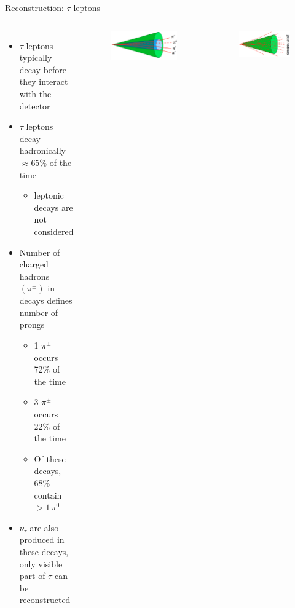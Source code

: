 \documentclass[aspectratio=169,xcolor=table]{beamer}
\begin{document}
    \begin{frame}[t]{Reconstruction: $\tau$ leptons}
      \begin{columns}
        \begin{itemize}
          \item $\tau$ leptons typically decay before they interact with the detector
          \item $\tau$ leptons decay hadronically $\approx 65\%$ of the time
          \begin{itemize}
            \item leptonic decays are not considered
          \end{itemize}
          \item Number of charged hadrons $(\pi^{\pm})$ in decays defines number of prongs
          \begin{itemize}
            \item 1 $\pi^{\pm}$ occurs 72\% of the time
            \item 3 $\pi^{\pm}$ occurs 22\% of the time
            \item Of these decays, 68\% contain $> 1\, \pi^{0}$
          \end{itemize}
          \item $\nu_{\tau}$ are also produced in these decays, only visible part of $\tau$ can be reconstructed
        \end{itemize}

        \centering
        \begin{figure}
        \includegraphics[width=.6\textwidth,keepaspectratio=true]{tau_hadronic_decay.png}
        \end{figure}
        \begin{figure}
        \includegraphics[width=.6\textwidth,keepaspectratio=true]{jet_particle.png}
        \caption{\tiny \cite{tau-diagrams}}
        \end{figure}
      \end{columns}
    \end{frame}
\end{document}

